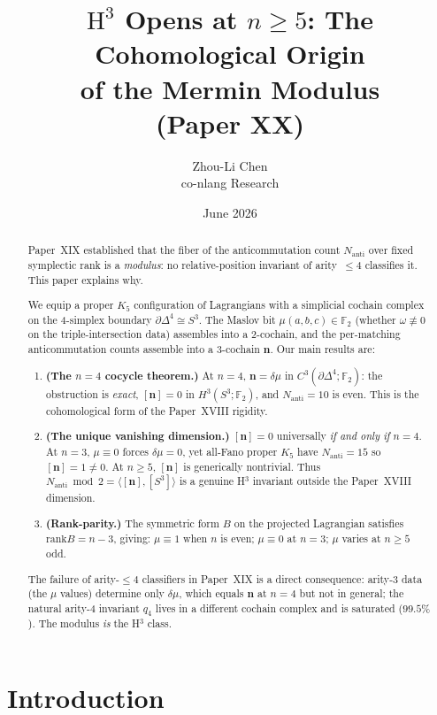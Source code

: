 \documentclass[11pt,a4paper]{article}
\title{$\mathrm{H}^3$ Opens at $n\ge5$: The Cohomological Origin\\
       of the Mermin Modulus\\
       {\large (Paper XX)}}
\author{Zhou-Li Chen \\ co-nlang Research}
\date{June 2026}
\theoremstyle{remark}
\newcommand{\F}{\mathbb{F}}
\newcommand{\rank}{\mathrm{rank}}
\newcommand{\Nanti}{N_{\mathrm{anti}}}
\begin{document}
\maketitle

\begin{abstract}
Paper~XIX established that the fiber of the anticommutation count $\Nanti$
over fixed symplectic rank is a \emph{modulus}: no relative-position invariant
of arity~$\le4$ classifies it.  This paper explains why.

We equip a proper $K_5$ configuration of Lagrangians with a simplicial cochain
complex on the 4-simplex boundary $\partial\Delta^4\cong S^3$.  The Maslov bit
$\mu(a,b,c)\in\F_2$ (whether $\omega\not\equiv0$ on the
triple-intersection data) assembles into a 2-cochain, and the per-matching
anticommutation counts assemble into a 3-cochain $\mathbf{n}$.
Our main results are:
\begin{enumerate}
\item \textbf{(The $n=4$ cocycle theorem.)}  At $n=4$,
  $\mathbf{n}=\delta\mu$ in $C^3(\partial\Delta^4;\F_2)$: the obstruction is
  \emph{exact}, $[\mathbf{n}]=0$ in $H^3(S^3;\F_2)$, and $\Nanti=10$ is even.
  This is the cohomological form of the Paper~XVIII rigidity.
\item \textbf{(The unique vanishing dimension.)}  $[\mathbf{n}]=0$ universally
  \emph{if and only if} $n=4$.  At $n=3$, $\mu\equiv0$ forces $\delta\mu=0$,
  yet all-Fano proper $K_5$ have $\Nanti=15$ so $[\mathbf{n}]=1\ne0$.
  At $n\ge5$, $[\mathbf{n}]$ is generically nontrivial.
  Thus $\Nanti\bmod2=\langle[\mathbf{n}],[S^3]\rangle$ is a genuine H$^3$
  invariant outside the Paper~XVIII dimension.
\item \textbf{(Rank-parity.)}  The symmetric form $B$ on the projected
  Lagrangian satisfies $\rank B=n-3$, giving: $\mu\equiv1$ when $n$ is even;
  $\mu\equiv0$ at $n=3$; $\mu$ varies at $n\ge5$ odd.
\end{enumerate}
The failure of arity-$\le4$ classifiers in Paper~XIX is a direct consequence:
arity-3 data (the $\mu$ values) determine only $\delta\mu$, which equals
$\mathbf{n}$ at $n=4$ but not in general; the natural arity-4 invariant $q_4$
lives in a different cochain complex and is saturated ($99.5\%$).
The modulus \emph{is} the H$^3$ class.
\end{abstract}

\section{Introduction}
\end{document}
